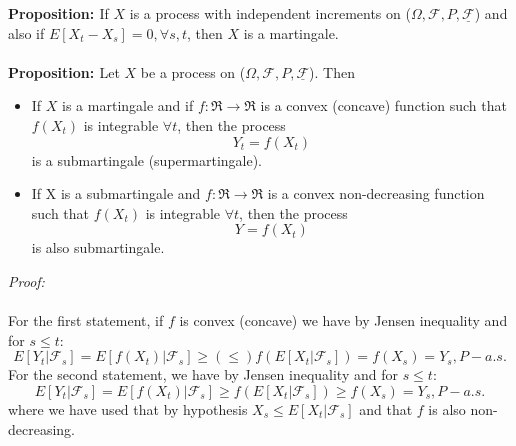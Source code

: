 \documentclass[a4paper,10pt]{report}
\theoremstyle{plain}
\theoremstyle{definition}
\newcommand{\PROP} {{\bf{Proposition: }}}
\newcommand{\PROOF} {{\emph{Proof: \\ \\}}}
\newcommand{\FF} {\mathcal{F} }
\newcommand{\FLT} {\underline{\mathcal{F}}}
\begin{document}
\PROP If $X$ is a process with independent increments on ($\Omega, \FF, P, \FLT$) and also if $E[X_t-X_s]=0, \forall s,t$, then $X$ is a martingale.\\ \\
\PROP Let $X$ be a process on ($\Omega, \FF, P, \FLT$). Then
\begin{itemize}
\item If $X$ is a martingale and if $f:\Re\rightarrow \Re$ is a convex (concave) function such that $f(X_t)$ is integrable $\forall t$, then the process
\[
Y_t=f(X_t)
\]
is a submartingale (supermartingale).
\item If X is a submartingale and $f:\Re\rightarrow \Re$ is a convex non-decreasing function such that $f(X_t)$ is integrable $\forall t$, then the process
\[
Y=f(X_t)
\]
is also submartingale.
\end{itemize}
\PROOF
For the first statement, if $f$ is convex (concave) we have by Jensen inequality and for $s\leq t$:
\[
E[Y_t|\FF_s]=E[f(X_t)|\FF_s]\geq (\leq) f\left(E[X_t|\FF_s]\right)=f(X_s)=Y_s, P-a.s.
\]
For the second statement, we have by Jensen inequality and for $s\leq t$:
\[
E[Y_t|\FF_s]=E[f(X_t)|\FF_s]\geq f\left(E[X_t|\FF_s]\right)\geq f(X_s)=Y_s, P-a.s.
\]
where we have used that by hypothesis $X_s\leq E[ X_t|\FF_s]$ and that $f$ is also non-decreasing.
\end{document}
